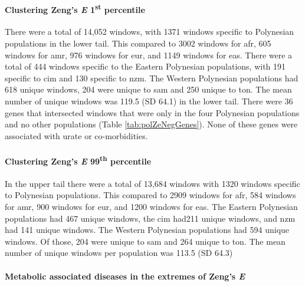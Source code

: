 \documentclass[]{report}
\let\oldparagraph\paragraph
\renewcommand{\paragraph}[1]{\oldparagraph{#1}\mbox{}}
\begin{document}
\paragraph{\texorpdfstring{Clustering Zeng's \emph{E}
1\textsuperscript{st}
percentile}{Clustering Zeng's E 1st percentile}}\label{clustering-zengs-e-1st-percentile}

There were a total of 14,052 windows, with 1371 windows specific to
Polynesian populations in the lower tail. This compared to 3002 windows
for \gls{afr}, 605 windows for \gls{amr}, 976 windows for \gls{eur}, and
1149 windows for \gls{eas}. There were a total of 444 windows specific
to the Eastern Polynesian populations, with 191 specific to \gls{cim}
and 130 specific to \gls{nzm}. The Western Polynesian populations had
618 unique windows, 204 were unique to \gls{sam} and 250 unique to
\gls{ton}. The mean number of unique windows was 119.5 (SD 64.1) in the
lower tail. There were 36 genes that intersected windows that were only
in the four Polynesian populations and no other populations (Table
\ref{tab:polZeNegGenes}). None of these genes were associated with urate
or co-morbidities.

\paragraph{\texorpdfstring{Clustering Zeng's \emph{E}
99\textsuperscript{th}
percentile}{Clustering Zeng's E 99th percentile}}\label{clustering-zengs-e-99th-percentile}

In the upper tail there were a total of 13,684 windows with 1320 windows
specific to Polynesian populations. This compared to 2909 windows for
\gls{afr}, 584 windows for \gls{amr}, 900 windows for \gls{eur}, and
1200 windows for \gls{eas}. The Eastern Polynesian populations had 467
unique windows, the \gls{cim} had211 unique windows, and \gls{nzm} had
141 unique windows. The Western Polynesian populations had 594 unique
windows. Of those, 204 were unique to \gls{sam} and 264 unique to
\gls{ton}. The mean number of unique windows per population was 113.5
(SD 64.3)

\paragraph{\texorpdfstring{Metabolic associated diseases in the extremes
of Zeng's
\emph{E}}{Metabolic associated diseases in the extremes of Zeng's E}}\label{metabolic-associated-diseases-in-the-extremes-of-zengs-e}
\end{document}

